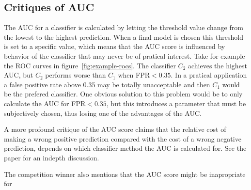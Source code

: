 \subsection{Critiques of AUC}\label{sec:auc-critique}
The AUC for a classifier is calculated by letting the threshold value change from the lowest to the highest prediction. When a final model is chosen this threshold is set to a specific value, which means that the AUC score is influenced by behavior of the classifier that may never be of pratical interest. Take for example the ROC curves in figure~\ref{fig:example-rocs}. The classifier $C_2$ achieves the highest AUC, but $C_2$ performs worse than $C_1$ when FPR$<0.35$. In a pratical application a false positive rate above 0.35 may be totally unacceptable and then $C_1$ would be the prefered classifier. One obvious solution to this problem would be to only calculate the AUC for FPR$<0.35$, but this introduces a parameter that must be subjectively chosen, thus losing one of the advantages of the AUC. \par
A more profound critique of the AUC score claims that the relative cost of making a wrong positive prediction compared with the cost of a wrong negative prediction, depends on which classifier method the AUC is calculated for. See the paper \citet{hand09} for an indepth discussion. \par
The competition winner also mentions that the AUC score might be inapropriate for \TFC\ \citep[p.5]{inference_winning_approach}




